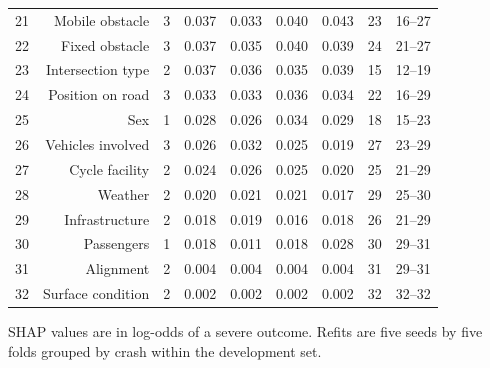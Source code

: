 \begin{table}[tp]
\begin{threeparttable}
{\begin{tabular}{lrrrrrrrr}
21 & Mobile obstacle & 3 & 0.037 & 0.033 & 0.040 & 0.043 & 23 & 16–27 \\
22 & Fixed obstacle & 3 & 0.037 & 0.035 & 0.040 & 0.039 & 24 & 21–27 \\
23 & Intersection type & 2 & 0.037 & 0.036 & 0.035 & 0.039 & 15 & 12–19 \\
24 & Position on road & 3 & 0.033 & 0.033 & 0.036 & 0.034 & 22 & 16–29 \\
25 & Sex & 1 & 0.028 & 0.026 & 0.034 & 0.029 & 18 & 15–23 \\
26 & Vehicles involved & 3 & 0.026 & 0.032 & 0.025 & 0.019 & 27 & 23–29 \\
27 & Cycle facility & 2 & 0.024 & 0.026 & 0.025 & 0.020 & 25 & 21–29 \\
28 & Weather & 2 & 0.020 & 0.021 & 0.021 & 0.017 & 29 & 25–30 \\
29 & Infrastructure & 2 & 0.018 & 0.019 & 0.016 & 0.018 & 26 & 21–29 \\
30 & Passengers & 1 & 0.018 & 0.011 & 0.018 & 0.028 & 30 & 29–31 \\
31 & Alignment & 2 & 0.004 & 0.004 & 0.004 & 0.004 & 31 & 29–31 \\
32 & Surface condition & 2 & 0.002 & 0.002 & 0.002 & 0.002 & 32 & 32–32 \\
\bottomrule
\end{tabular}}
\begin{tablenotes}[flushleft]\footnotesize
\item SHAP values are in log-odds of a severe outcome. Refits are five seeds by five folds grouped by crash within the development set.
\end{tablenotes}
\end{threeparttable}
\end{table}
